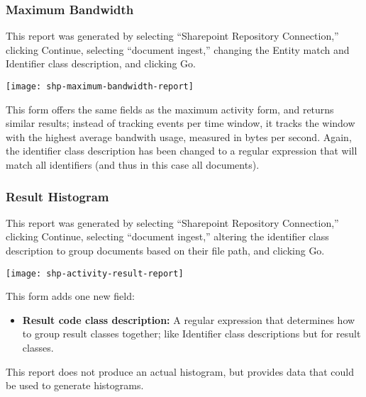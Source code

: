 \begin{changemargin}{1.5in}{0in}
\subsubsection{Maximum Bandwidth}

This report was generated by selecting ``Sharepoint Repository
Connection,'' clicking Continue, selecting ``document ingest,''
changing the Entity match and Identifier class description, and
clicking Go.

\texttt{[image: shp-maximum-bandwidth-report]}

This form offers the same fields as the maximum activity form, and
returns similar results; instead of tracking events per time window,
it tracks the window with the highest average bandwith usage, measured
in bytes per second. Again, the identifier class description has been
changed to a regular expression that will match all identifiers (and
thus in this case all documents).

\subsubsection{Result Histogram}

This report was generated by selecting ``Sharepoint Repository
Connection,'' clicking Continue, selecting ``document ingest,''
altering the identifier class description to group documents based on
their file path, and clicking Go.

\texttt{[image: shp-activity-result-report]}

This form adds one new field:

\begin{itemize}

\item \textbf{Result code class description:} A regular expression that
determines how to group result classes together; like Identifier class
descriptions but for result classes.

\end{itemize}

This report does not produce an actual histogram, but provides data that
could be used to generate histograms.  

\end{changemargin}
